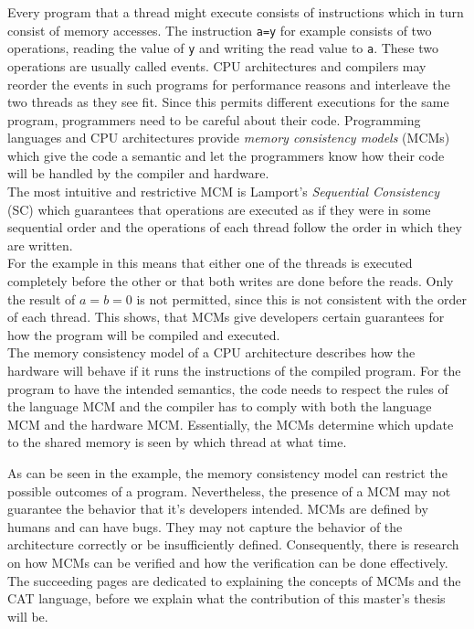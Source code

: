 \documentclass[a4paper,twoside,12pt, english]{article}
\begin{document}
Every program that a thread might execute consists of instructions which in turn consist of memory accesses. The instruction \texttt{a=y} for example consists of two operations, reading the value of \texttt{y} and writing the read value to \texttt{a}. These two operations are usually called events.
CPU architectures and compilers may reorder the events in such programs for performance reasons and interleave the two threads as they see fit. 
Since this permits different executions for the same program, programmers need to be careful about their code. Programming languages and CPU architectures provide \textit{memory consistency models} (MCMs) which give the code a semantic and let the programmers know how their code will be handled by the compiler and hardware. \\
The most intuitive and restrictive MCM is Lamport's \textit{Sequential Consistency} (SC) \cite{Lam79} which guarantees that operations are executed as if they were in some sequential order and the operations of each thread follow the order in which they are written.\\
For the example in  this means that either one of the threads is executed completely before the other or that both writes are done before the reads. Only the result of $a=b=0$ is not permitted, since this is not consistent with the order of each thread. 
This shows, that MCMs give developers certain guarantees for how the program will be compiled and executed. \\ 
The memory consistency model of a CPU architecture describes how the hardware will behave if it runs the instructions of the compiled program. For the program to have the intended semantics, the code needs to respect the rules of the language MCM and the compiler has to comply with both the language MCM and the hardware MCM.
Essentially, the MCMs  determine which update to the shared memory is seen by which thread at what time.

As can be seen in the example, the memory consistency model can restrict the possible outcomes of a program. Nevertheless, the presence of a MCM may not guarantee the behavior that it's developers intended. 
MCMs are defined by humans and can have bugs. They may not capture the behavior of the architecture correctly or be insufficiently defined. 
Consequently, there is research on how MCMs can be verified and how the verification can be done effectively. \\
The succeeding pages are dedicated to explaining the concepts of MCMs and the CAT language, before we explain what the contribution of this master's thesis will be.
\end{document}
